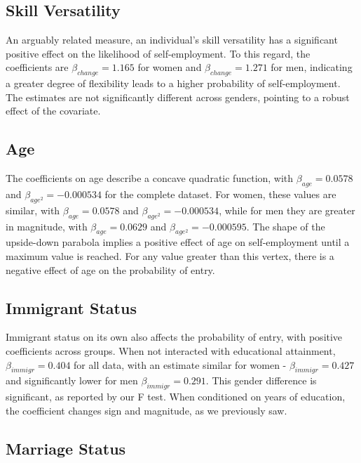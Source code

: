 \subsection{Skill Versatility}

An arguably related measure, an individual’s skill versatility has a significant positive effect on the likelihood of self-employment. To this regard, the coefficients are $\beta_{change} = 1.165$ for women and $\beta_{change} = 1.271$ for men, indicating a greater degree of flexibility leads to a higher probability of self-employment. The estimates are not significantly different across genders, pointing to a robust effect of the covariate. 

\subsection{Age}

The coefficients on age describe a concave quadratic function, with $\beta_{age} = 0.0578$ and $\beta_{age^2} = -0.000534$ for the complete dataset. For women, these values are similar, with $\beta_{age} = 0.0578$ and $\beta_{age^2} = -0.000534$, while for men they are greater in magnitude, with $\beta_{age} = 0.0629$ and $\beta_{age^2} = -0.000595$. The shape of the upside-down parabola implies a positive effect of age on self-employment until a maximum value is reached. For any value greater than this vertex, there is a negative effect of age on the probability of entry. 

\subsection{Immigrant Status}

Immigrant status on its own also affects the probability of entry, with positive coefficients across groups. When not interacted with educational attainment, $\beta_{immigr} = 0.404$ for all data, with an estimate similar for women - $\beta_{immigr} = 0.427$ and significantly lower for men $\beta_{immigr} = 0.291$. This gender difference is significant, as reported by our F test. When conditioned on years of education, the coefficient changes sign and magnitude, as we previously saw. 

\subsection{Marriage Status}

